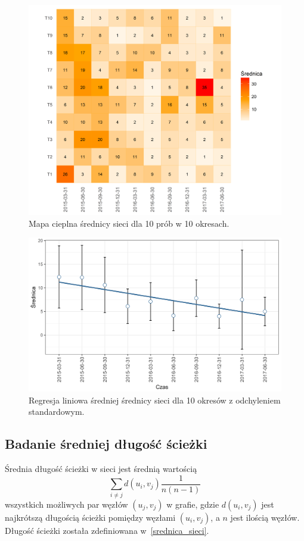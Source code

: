 \documentclass[12pt, twoside, final, openany]{mgr}
\newcommand{\chartsWidth}{0.8}
\begin{document}
\begin{figure}[H]
\centering
  \includegraphics[width=\chartsWidth\linewidth]{pictures/srednica/srednica_hm.png}
  \caption{Mapa cieplna średnicy sieci dla 10 prób w 10 okresach.}
  \label{fig:s1} 
\end{figure}
\begin{figure}[H]
\centering
  \includegraphics[width=\chartsWidth\linewidth]{pictures/srednica/srednica_sda.png}
  \caption{Regresja liniowa średniej średnicy sieci dla 10 okresów z odchyleniem standardowym.}
  \label{fig:s2}
\end{figure}


\subsection{Badanie średniej długość ścieżki}
\label{dlugosc_sciezki}
\indent Średnia długość ścieżki w sieci jest średnią wartością 
\begin{equation}
\label{eq:dlugosc_sciezki}
	\sum_{i \ne j}^{} d(u_i,v_j)\frac{1}{n(n-1)}
\end{equation}
wszystkich możliwych par węzłów $(u_j,v_j)$ w grafie, gdzie $d(u_i,v_j)$ jest najkrótszą długością ścieżki pomiędzy węzłami $(u_i,v_j)$, a $n$ jest ilością węzłów\cite{wasserman1994social}. Długość ścieżki została zdefiniowana w~\ref{srednica_sieci}. 
\end{document}
